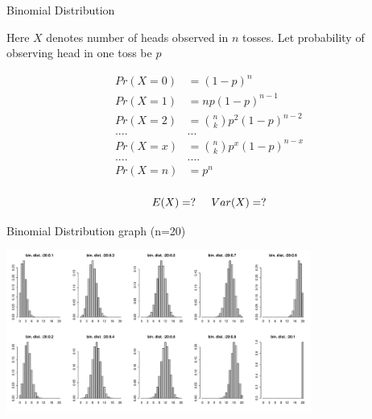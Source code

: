 \documentclass{beamer}\usepackage[]{graphicx}\usepackage[]{color}
\begin{document}
\begin{frame}[fragile]{Binomial Distribution \;\;}

Here $X$ denotes number of heads observed in $n$ tosses. Let probability of observing head in one toss be $p$

\begin{align}
Pr(X=0) & = (1-p)^{n} \\
Pr(X=1) & = np(1-p)^{n-1} \\
Pr(X=2) & = {n \choose k} p^2 (1-p)^{n-2} \\
....  &  ...  \\
Pr(X=x) & = {n \choose k} p^x (1-p)^{n-x}  \\
.... &  .... \\
Pr(X=n) & = p^{n} \\
\end{align}

$$ E(X) = ?  \hspace{0.5 cm} Var(X) = ?  $$

\end{frame}

\begin{frame}[fragile]{Binomial Distribution graph (n=20) \;\;}


\includegraphics[width=10cm,keepaspectratio]{binomial_plots.pdf}
\end{frame}
\end{document}
